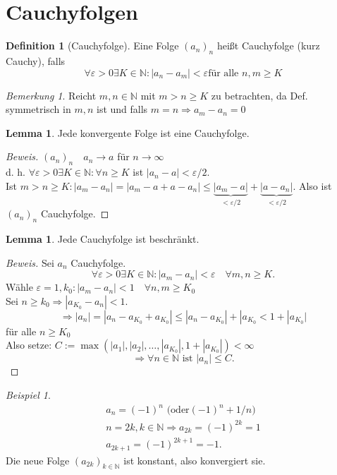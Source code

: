 \documentclass[12pt,a4paper,titlepage]{article} %
\theoremstyle{definition}
\newtheorem{lem}[satz]{Lemma}
\newtheorem{defi}[satz]{Definition}
\theoremstyle{remark}
\newtheorem*{bem}{Bemerkung}
\newtheorem*{bsp}{Beispiel}
\newenvironment{bew}{\begin{proof}[Beweis]}{\end{proof}}
\newcommand{\N}{\mathbb{N}}
\begin{document}
\section{Cauchyfolgen}
\begin{defi}[Cauchyfolge]
	Eine Folge \((a_n)_n\) heißt Cauchyfolge (kurz Cauchy), falls
	\[\forall \varepsilon>0 \exists K\in\N: |a_n-a_m| < \varepsilon \text{für alle } n,m\geq K \]
\end{defi}
\begin{bem}
	Reicht \(m,n\in\N\) mit \( m>n\geq K \) zu betrachten, da Def. symmetrisch in \(m,n\) ist und falls \(m=n \Rightarrow a_m-a_n=0\)
\end{bem}
\begin{lem}
	Jede konvergente Folge ist eine Cauchyfolge.
\end{lem}
\begin{bew}
	\( (a_n)_n \quad a_n \rightarrow a \) für \(n\rightarrow\infty\) \\
	d. h. \( \forall \varepsilon > 0 \exists K \in \N: \forall n\geq K \) ist \( |a_n-a| < \varepsilon/2 \).\\
	Ist \(m>n\geq K: |a_m -a_n| = |a_m-a+a-a_n| \leq \underbrace{|a_m-a|}_{<\varepsilon/2} + \underbrace{ |a-a_n| }_{<\varepsilon/2}. \) Also ist \((a_n)_n\) Cauchyfolge.
\end{bew}
\begin{lem}
	Jede Cauchyfolge ist beschränkt.
\end{lem}
\begin{bew}
	Sei \(a_n\) Cauchyfolge. 
	\[ \forall \varepsilon > 0 \exists K\in\N:|a_m-a_n| < \varepsilon \quad \forall m,n\geq K. \]
	Wähle \(\varepsilon = 1, k_0: |a_m-a_n| < 1 \quad \forall n,m\geq K_0 \)\\
	Sei \(n \geq k_0 \Rightarrow |a_{K_0} - a_n| < 1. \)
	\[ \Rightarrow |a_n| = |a_n - a_{K_0} + a_{K_0}| \leq |a_n - a_{K_0}| + |a_{K_0} < 1 + |a_{K_0}| \] für alle \(n\geq K_0\)\\
	Also setze: \( C := \max ( |a_1|,|a_2|,\ldots,|a_{K_0}|,1+|a_{K_0}| ) < \infty \) 
	\[ \Rightarrow \forall n\in\N \text{ ist } |a_n| \leq C. \]
\end{bew}
\begin{bsp}
	\begin{align*}
		a_n = (-1)^n \text{ (oder} (-1)^n + 1/n \text{)}\\
		n = 2k, k\in\N \Rightarrow a_{2k} = (-1)^{2k} = 1\\
		a_{2k+1} = (-1)^{2k+1} = -1.
	\end{align*}
	Die neue Folge \( (a_{2k})_{k\in\N} \) ist konstant, also konvergiert sie.
\end{bsp}
\end{document}
